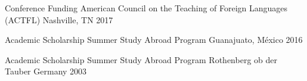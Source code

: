 \begin{cvhonors}
\cvhonor
{Conference Funding} %
{American Council on the Teaching of Foreign Languages (ACTFL) } %
{Nashville, TN} %
{2017} %


\cvhonor
{Academic Scholarship} %
{Summer Study Abroad Program} %
{Guanajuato, México} %
{2016} %


\cvhonor
{Academic Scholarship} %
{Summer Study Abroad Program} %
{Rothenberg ob der Tauber Germany} %
{2003} %


\end{cvhonors}